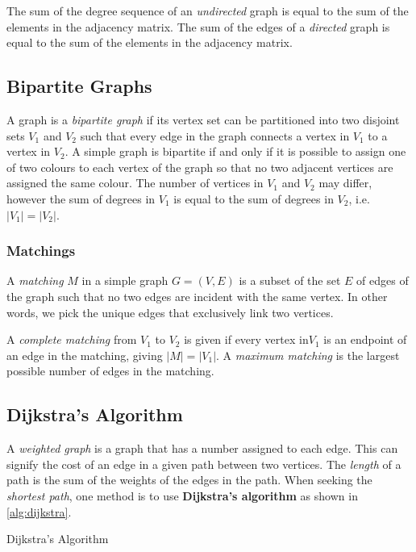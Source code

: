 \begin{itemize}
	The sum of the degree sequence of an \emph{undirected} graph is equal to the sum of the elements in the adjacency matrix.
	The sum of the edges of a \emph{directed} graph is equal to the sum of the elements in the adjacency matrix.

	\subsection{Bipartite Graphs}
A graph is a \emph{bipartite graph} if its vertex set can be partitioned into two disjoint sets \( V_1 \) and \( V_2 \) such that every edge in the graph connects a vertex in \( V_1 \) to a vertex in \( V_2 \).
A simple graph is bipartite if and only if it is possible to assign one of two colours to each vertex of the graph so that no two adjacent vertices are assigned the same colour.
The number of vertices in \( V_1 \) and \( V_2 \) may differ, however the sum of degrees in \( V_1 \) is equal to the sum of degrees in \( V_2 \), i.e. \( |V_1|=|V_2| \).

\subsubsection{Matchings}
A \emph{matching} \( M \) in a simple graph \( G = (V,E) \) is a subset of the set \( E \) of edges of the graph such that no two edges are incident with the same vertex. In other words, we pick the unique edges that exclusively link two vertices.

A \emph{complete matching} from \( V_1 \) to \( V_2 \) is given if every vertex in\(  V_1 \) is an endpoint of an edge in the matching, giving \( |M| = |V_1| \). A \emph{maximum matching} is the largest possible number of edges in the matching. 

\subsection{Dijkstra's Algorithm}
A \emph{weighted graph} is a graph that has a number assigned to each edge. This can signify the cost of an edge in a given path between two vertices.
The \emph{length} of a path is the sum of the weights of the edges in the path. When seeking the \emph{shortest path}, one method is to use \textbf{Dijkstra's algorithm} as shown in \autoref{alg:dijkstra}.
\begin{algorithm}[H]
	\caption{Dijkstra's Algorithm}\label{alg:dijkstra}
	\begin{algorithmic}
		\EndFor{}
		\EndIf{}
		\EndFor{}
		\EndWhile{}
		


\end{algorithmic}
\end{algorithm}
\end{itemize}
